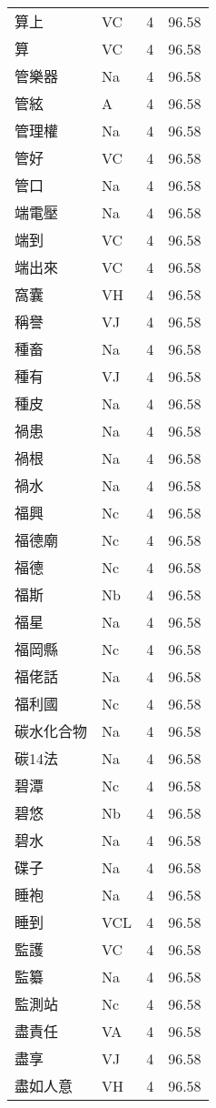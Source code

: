 \documentclass[twocolumn]{book}
\begin{document}
\begin{supertabular}{llrr}
算上 & VC & 4 &  96.58\\
算 & VC & 4 &  96.58\\
管樂器 & Na & 4 &  96.58\\
管絃 & A & 4 &  96.58\\
管理權 & Na & 4 &  96.58\\
管好 & VC & 4 &  96.58\\
管口 & Na & 4 &  96.58\\
端電壓 & Na & 4 &  96.58\\
端到 & VC & 4 &  96.58\\
端出來 & VC & 4 &  96.58\\
窩囊 & VH & 4 &  96.58\\
稱譽 & VJ & 4 &  96.58\\
種畜 & Na & 4 &  96.58\\
種有 & VJ & 4 &  96.58\\
種皮 & Na & 4 &  96.58\\
禍患 & Na & 4 &  96.58\\
禍根 & Na & 4 &  96.58\\
禍水 & Na & 4 &  96.58\\
福興 & Nc & 4 &  96.58\\
福德廟 & Nc & 4 &  96.58\\
福德 & Nc & 4 &  96.58\\
福斯 & Nb & 4 &  96.58\\
福星 & Na & 4 &  96.58\\
福岡縣 & Nc & 4 &  96.58\\
福佬話 & Na & 4 &  96.58\\
福利國 & Nc & 4 &  96.58\\
碳水化合物 & Na & 4 &  96.58\\
碳14法 & Na & 4 &  96.58\\
碧潭 & Nc & 4 &  96.58\\
碧悠 & Nb & 4 &  96.58\\
碧水 & Na & 4 &  96.58\\
碟子 & Na & 4 &  96.58\\
睡袍 & Na & 4 &  96.58\\
睡到 & VCL & 4 &  96.58\\
監護 & VC & 4 &  96.58\\
監纂 & Na & 4 &  96.58\\
監測站 & Nc & 4 &  96.58\\
盡責任 & VA & 4 &  96.58\\
盡享 & VJ & 4 &  96.58\\
盡如人意 & VH & 4 &  96.58\\

\end{supertabular}
\end{document}
